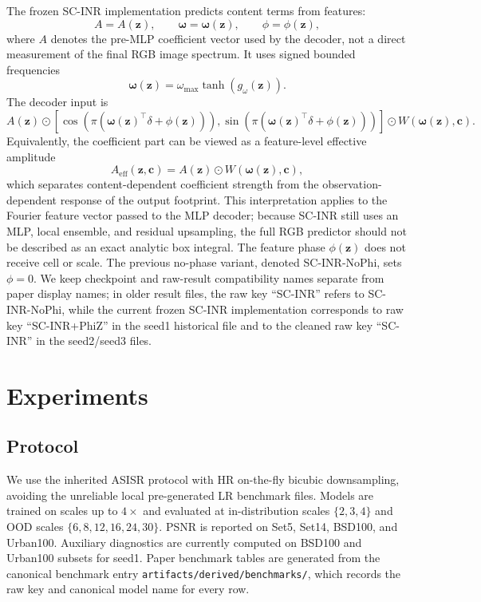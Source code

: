\documentclass[10pt]{article}
\newcommand{\cell}{\mathbf{c}}
\newcommand{\feat}{\mathbf{z}}
\newcommand{\freq}{\boldsymbol{\omega}}
\begin{document}
The frozen SC-INR implementation predicts content terms from features:
\begin{equation}
  A=A(\feat), \qquad \freq=\freq(\feat), \qquad \phi=\phi(\feat),
\end{equation}
where \(A\) denotes the pre-MLP coefficient vector used by the decoder, not a
direct measurement of the final RGB image spectrum.
It uses signed bounded frequencies
\begin{equation}
  \freq(\feat)=\omega_{\max}\tanh(g_\omega(\feat)).
\end{equation}
The decoder input is
\begin{equation}
  A(\feat)\odot
  \left[
  \cos(\pi(\freq(\feat)^\top\delta+\phi(\feat))),
  \sin(\pi(\freq(\feat)^\top\delta+\phi(\feat)))
  \right]
  \odot W(\freq(\feat),\cell).
\end{equation}
Equivalently, the coefficient part can be viewed as a feature-level effective
amplitude
\begin{equation}
  A_{\mathrm{eff}}(\feat,\cell)=A(\feat)\odot W(\freq(\feat),\cell),
\end{equation}
which separates content-dependent coefficient strength from the
observation-dependent response of the output footprint. This interpretation
applies to the Fourier feature vector passed to the MLP decoder; because SC-INR
still uses an MLP, local ensemble, and residual upsampling, the full RGB
predictor should not be described as an exact analytic box integral.
The feature phase \(\phi(\feat)\) does not receive cell or scale. The previous
no-phase variant, denoted SC-INR-NoPhi, sets \(\phi=0\). We keep checkpoint and
raw-result compatibility names separate from paper display names; in older
result files, the raw key ``SC-INR'' refers to SC-INR-NoPhi, while the current
frozen SC-INR implementation corresponds to raw key ``SC-INR+PhiZ'' in the seed1
historical file and to the cleaned raw key ``SC-INR'' in the seed2/seed3 files.

\section{Experiments}

\subsection{Protocol}

We use the inherited ASISR protocol with HR on-the-fly bicubic downsampling,
avoiding the unreliable local pre-generated LR benchmark files. Models are
trained on scales up to \(4\times\) and evaluated at in-distribution scales
\(\{2,3,4\}\) and OOD scales \(\{6,8,12,16,24,30\}\). PSNR is reported on
Set5, Set14, BSD100, and Urban100. Auxiliary diagnostics are currently computed
on BSD100 and Urban100 subsets for seed1. Paper benchmark tables are generated
from the canonical benchmark entry \texttt{artifacts/derived/benchmarks/}, which
records the raw key and canonical model name for every row.
\end{document}

